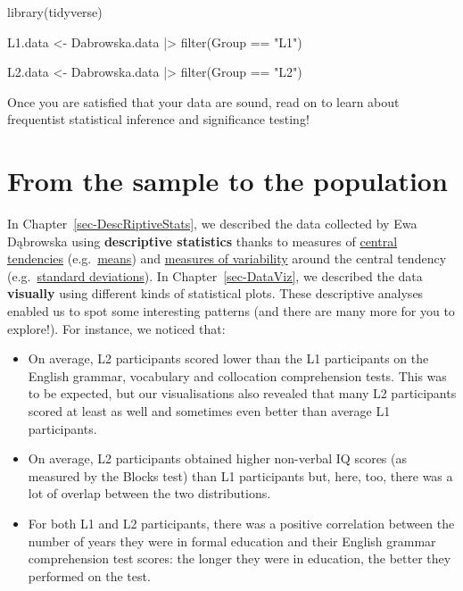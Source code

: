 \documentclass[
  letterpaper,
  DIV=11,
  numbers=noendperiod]{scrreprt}
\newenvironment{Shaded}{\begin{snugshade}}{\end{snugshade}}
\newcommand{\FunctionTok}[1]{\textcolor[rgb]{0.28,0.35,0.67}{#1}}
\newcommand{\NormalTok}[1]{\textcolor[rgb]{0.00,0.23,0.31}{#1}}
\newcommand{\OtherTok}[1]{\textcolor[rgb]{0.00,0.23,0.31}{#1}}
\newcommand{\SpecialCharTok}[1]{\textcolor[rgb]{0.37,0.37,0.37}{#1}}
\newcommand{\StringTok}[1]{\textcolor[rgb]{0.13,0.47,0.30}{#1}}
\begin{document}
\begin{tcolorbox}
\begin{Shaded}
\begin{Highlighting}[]
\FunctionTok{library}\NormalTok{(tidyverse)}

\NormalTok{L1.data }\OtherTok{\textless{}{-}}\NormalTok{ Dabrowska.data }\SpecialCharTok{|\textgreater{}} 
  \FunctionTok{filter}\NormalTok{(Group }\SpecialCharTok{==} \StringTok{"L1"}\NormalTok{)}

\NormalTok{L2.data }\OtherTok{\textless{}{-}}\NormalTok{ Dabrowska.data }\SpecialCharTok{|\textgreater{}} 
  \FunctionTok{filter}\NormalTok{(Group }\SpecialCharTok{==} \StringTok{"L2"}\NormalTok{)}
\end{Highlighting}
\end{Shaded}

Once you are satisfied that your data are sound, read on to learn about
frequentist statistical inference and significance testing!

\end{tcolorbox}

\section{From the sample to the population}\label{sec-Sampling}

In Chapter~\ref{sec-DescRiptiveStats}, we described the data collected
by Ewa Dąbrowska using \textbf{descriptive statistics} thanks to
measures of \hyperref[sec-CentralTendency]{central tendencies}
(e.g.~\hyperref[sec-means]{means}) and
\hyperref[sec-Variability]{measures of variability} around the central
tendency (e.g.~\hyperref[sec-SD]{standard deviations}). In
Chapter~\ref{sec-DataViz}, we described the data \textbf{visually} using
different kinds of statistical plots. These descriptive analyses enabled
us to spot some interesting patterns (and there are many more for you to
explore!). For instance, we noticed that:

\begin{itemize}
\item
  On average, L2 participants scored lower than the L1 participants on
  the English grammar, vocabulary and collocation comprehension tests.
  This was to be expected, but our visualisations also revealed that
  many L2 participants scored at least as well and sometimes even better
  than average L1 participants.
\item
  On average, L2 participants obtained higher non-verbal IQ scores (as
  measured by the Blocks test) than L1 participants but, here, too,
  there was a lot of overlap between the two distributions.
\item
  For both L1 and L2 participants, there was a positive correlation
  between the number of years they were in formal education and their
  English grammar comprehension test scores: the longer they were in
  education, the better they performed on the test.
\end{itemize}
\end{document}
